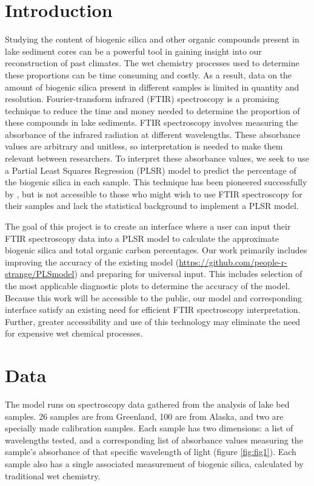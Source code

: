 \documentclass[water,article,submit,moreauthors,pdftex]{mdpi}
\begin{document}

\section{Introduction}\label{introduction}

Studying the content of biogenic silica and other organic compounds
present in lake sediment cores can be a powerful tool in gaining insight
into our reconstruction of past climates. The wet chemistry processes
used to determine these proportions can be time consuming and costly. As
a result, data on the amount of biogenic silica present in different
samples is limited in quantity and resolution. Fourier-transform
infrared (FTIR) spectroscopy is a promising technique to reduce the time
and money needed to determine the proportion of these compounds in lake
sediments. FTIR spectroscopy involves measuring the absorbance of the
infrared radiation at different wavelengths. These absorbance values are
arbitrary and unitless, so interpretation is needed to make them
relevant between researchers. To interpret these absorbance values, we
seek to use a Partial Least Squares Regression (PLSR) model to predict
the percentage of the biogenic silica in each sample. This technique has
been pioneered successfully by \citet{vogel2008fourier}, but is not
accessible to those who might wish to use FTIR spectroscopy for their
samples and lack the statistical background to implement a PLSR model.

The goal of this project is to create an interface where a user can
input their FTIR spectroscopy data into a PLSR model to calculate the
approximate biogenic silica and total organic carbon percentages. Our
work primarily includes improving the accuracy of the existing model
(\url{https://github.com/people-r-strange/PLSmodel}) and preparing for
universal input. This includes selection of the most applicable
diagnostic plots to determine the accuracy of the model. Because this
work will be accessible to the public, our model and corresponding
interface satisfy an existing need for efficient FTIR spectroscopy
interpretation. Further, greater accessibility and use of this
technology may eliminate the need for expensive wet chemical processes.

\section{Data}\label{data}

The model runs on spectroscopy data gathered from the analysis of lake
bed samples. 26 samples are from Greenland, 100 are from Alaska, and two
are specially made calibration samples. Each sample has two dimensions:
a list of wavelengths tested, and a corresponding list of absorbance
values measuring the sample's absorbance of that specific wavelength of
light (figure \ref{fig:fig1}). Each sample also has a single associated
measurement of biogenic silica, calculated by traditional wet chemistry.
\end{document}
